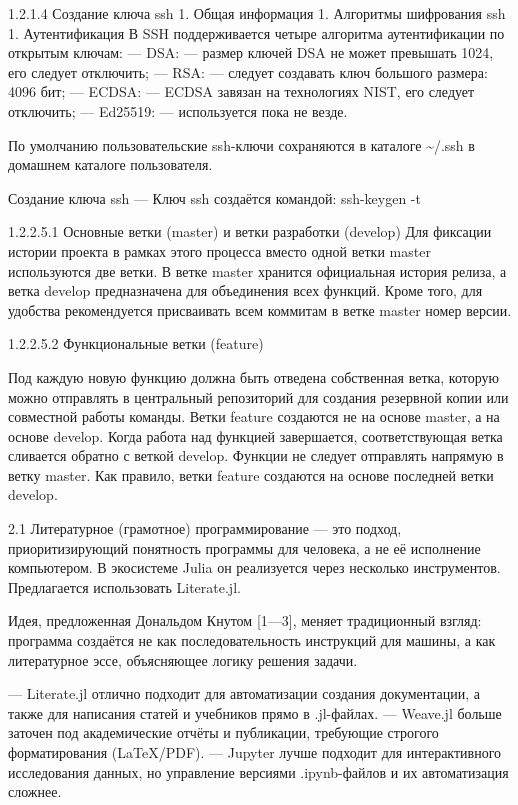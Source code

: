 \documentclass[
  english,
  russian,
  12pt,
  a4paper,
  DIV=11,
  numbers=noendperiod]{scrreprt}
\begin{document}
1.2.1.4 Создание ключа ssh 1. Общая информация 1. Алгоритмы шифрования
ssh 1. Аутентификация В SSH поддерживается четыре алгоритма
аутентификации по открытым ключам: --- DSA: --- размер ключей DSA не
может превышать 1024, его следует отключить; --- RSA: --- следует
создавать ключ большого размера: 4096 бит; --- ECDSA: --- ECDSA завязан
на технологиях NIST, его следует отключить; --- Ed25519: ---
используется пока не везде.

По умолчанию пользовательские ssh-ключи сохраняются в каталоге
\textasciitilde/.ssh в домашнем каталоге пользователя.

Создание ключа ssh --- Ключ ssh создаётся командой: ssh-keygen -t

1.2.2.5.1 Основные ветки (master) и ветки разработки (develop) Для
фиксации истории проекта в рамках этого процесса вместо одной ветки
master используются две ветки. В ветке master хранится официальная
история релиза, а ветка develop предназначена для объединения всех
функций. Кроме того, для удобства рекомендуется присваивать всем
коммитам в ветке master номер версии.

1.2.2.5.2 Функциональные ветки (feature)

Под каждую новую функцию должна быть отведена собственная ветка, которую
можно отправлять в центральный репозиторий для создания резервной копии
или совместной работы команды. Ветки feature создаются не на основе
master, а на основе develop. Когда работа над функцией завершается,
соответствующая ветка сливается обратно с веткой develop. Функции не
следует отправлять напрямую в ветку master. Как правило, ветки feature
создаются на основе последней ветки develop.

2.1 Литературное (грамотное) программирование --- это подход,
приоритизирующий понятность программы для человека, а не её исполнение
компьютером. В экосистеме Julia он реализуется через несколько
инструментов. Предлагается использовать Literate.jl.

Идея, предложенная Дональдом Кнутом {[}1---3{]}, меняет традиционный
взгляд: программа создаётся не как последовательность инструкций для
машины, а как литературное эссе, объясняющее логику решения задачи.

--- Literate.jl отлично подходит для автоматизации создания
документации, а также для написания статей и учебников прямо в
.jl-файлах. --- Weave.jl больше заточен под академические отчёты и
публикации, требующие строгого форматирования (LaTeX/PDF). --- Jupyter
лучше подходит для интерактивного исследования данных, но управление
версиями .ipynb-файлов и их автоматизация сложнее.
\end{document}
